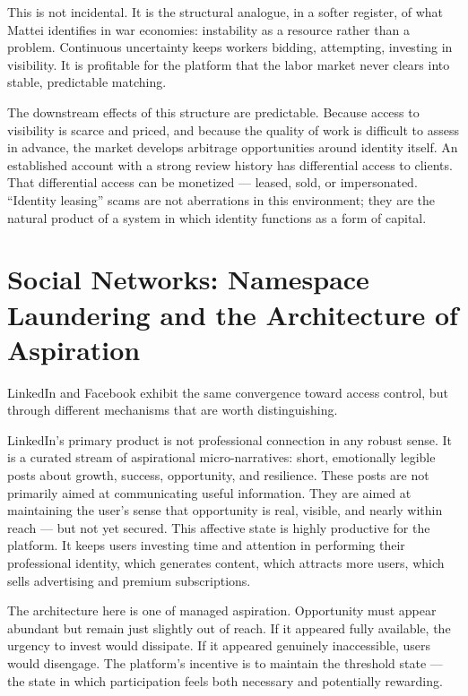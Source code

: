 \documentclass[12pt, a4paper]{article}
\begin{document}
This is not incidental. It is the structural analogue, in a softer register,
of what Mattei identifies in war economies: instability as a resource rather
than a problem. Continuous uncertainty keeps workers bidding, attempting,
investing in visibility. It is profitable for the platform that the labor
market never clears into stable, predictable matching.

The downstream effects of this structure are predictable. Because access to
visibility is scarce and priced, and because the quality of work is difficult
to assess in advance, the market develops arbitrage opportunities around
identity itself. An established account with a strong review history has
differential access to clients. That differential access can be monetized ---
leased, sold, or impersonated. ``Identity leasing'' scams are not aberrations
in this environment; they are the natural product of a system in which
identity functions as a form of capital.

\section{Social Networks: Namespace Laundering and the Architecture of Aspiration}

LinkedIn and Facebook exhibit the same convergence toward access control, but
through different mechanisms that are worth distinguishing.

LinkedIn's primary product is not professional connection in any robust sense.
It is a curated stream of aspirational micro-narratives: short, emotionally
legible posts about growth, success, opportunity, and resilience. These posts
are not primarily aimed at communicating useful information. They are aimed at
maintaining the user's sense that opportunity is real, visible, and nearly
within reach --- but not yet secured. This affective state is highly
productive for the platform. It keeps users investing time and attention in
performing their professional identity, which generates content, which attracts
more users, which sells advertising and premium subscriptions.

The architecture here is one of managed aspiration. Opportunity must appear
abundant but remain just slightly out of reach. If it appeared fully available,
the urgency to invest would dissipate. If it appeared genuinely inaccessible,
users would disengage. The platform's incentive is to maintain the threshold
state --- the state in which participation feels both necessary and
potentially rewarding.
\end{document}
